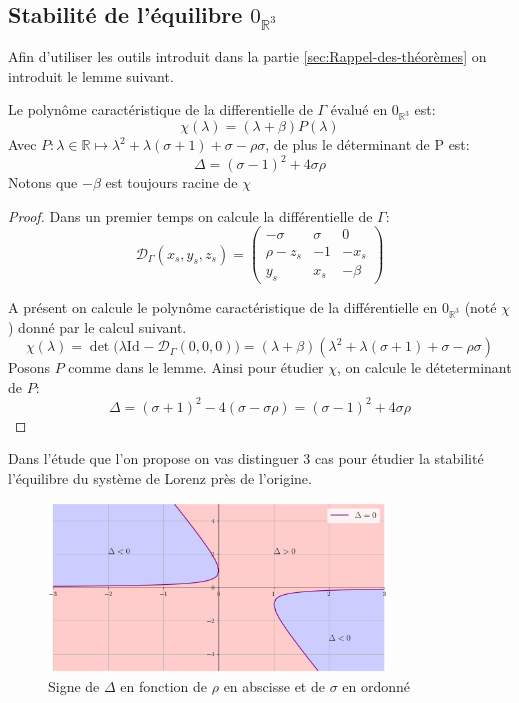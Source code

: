 \documentclass{article}
\newcommand{\R}{\mathbb{R}}
\newcommand{\id}[1][]{\ensuremath{\mathrm{Id}_{#1}}}
\newtheorem[M , nocut]{prop}{Proposition}[section]
\newtheorem[M , nocut]{definition}{Définition}
\newtheorem[M , nocut]{lemme}{Lemme}
\newtheorem[L , nocut]{thm}{Théoreme}
\newtheorem[M , nocut]{cor}{Corollaire}
\begin{document}
\subsection{Stabilité de l'équilibre $0_{\R^3}$}
Afin d'utiliser les outils introduit dans la partie \ref{sec:Rappel-des-théorèmes} on introduit le lemme suivant.
\begin{lemme}[préliminaire]
    Le polynôme caractéristique de la differentielle de $\Gamma$ évalué en $0_{\R^3}$ est:
    $$ \chi(\lambda) = (\lambda + \beta)P(\lambda)$$
    Avec $P:\lambda \in \R \mapsto \lambda^2 + \lambda(\sigma+1)+\sigma-\rho\sigma$, de plus le déterminant de P est:
    $$ \Delta = (\sigma-1)^2 +4\sigma\rho $$
    Notons que $-\beta$ est toujours racine de $\chi$
\end{lemme}

\begin{proof}
Dans un premier temps on calcule la différentielle de $\Gamma$:
\begin{equation}
    \label{eq:diff}
    \mathcal{D}_\Gamma(x_s,y_s,z_s) = 
    \left(\begin{array}{ccc}
        -\sigma & \sigma & 0\\
        \rho- z_s & -1 & -x_s\\
        y_s & x_s & -\beta
    \end{array}\right)
\end{equation}

A présent on calcule le polynôme caractéristique de la différentielle en $0_{\R^3}$ (noté $\chi$) donné par le calcul suivant.
\[
    \chi (\lambda) = \det\big(\lambda\id - \mathcal{D}_{\Gamma}(0,0,0)\big) = (\lambda + \beta)(\lambda^2 + \lambda(\sigma+1)+\sigma-\rho\sigma)
\]
Posons $P$ comme dans le lemme. Ainsi pour étudier $\chi$, on calcule le déteterminant de $P$:
\[
  \Delta = (\sigma+1)^2 - 4(\sigma-\sigma\rho) = (\sigma-1)^2 +4\sigma\rho
\]
\end{proof}

Dans l'étude que l'on propose on vas distinguer 3 cas pour étudier la stabilité l'équilibre du système de Lorenz près de l'origine.
\begin{figure}[ht]
    \centering
    \includegraphics[width=0.8\textwidth]{DeltaDomain}
    \caption{Signe de $\Delta$ en fonction de $\rho$ en abscisse et de $\sigma$ en ordonné}
    \label{fig:signD}
\end{figure}
\end{document}
